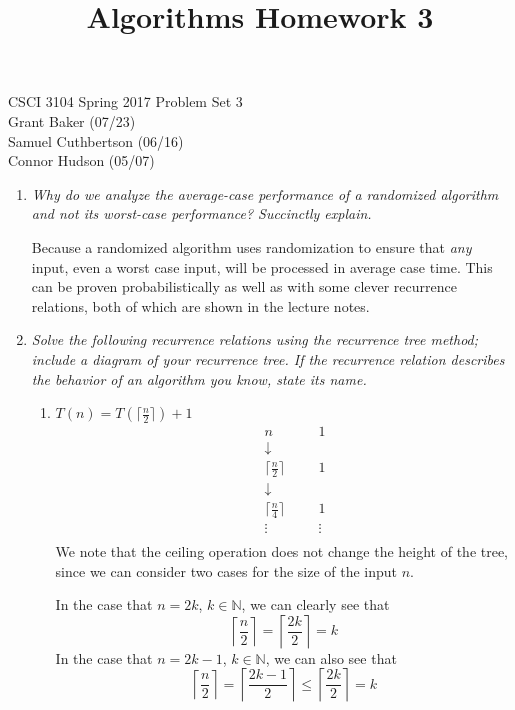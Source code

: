 \documentclass[12pt]{article}
\begin{document}
\title{Algorithms Homework 3}

CSCI 3104 Spring 2017 \hfill Problem Set 3\\
Grant Baker (07/23)\\
Samuel Cuthbertson (06/16)\\
Connor Hudson (05/07)\\


\hrulefill

\begin{enumerate}

	\item \textit{Why do we analyze the average-case performance of a randomized algorithm and not its worst-case performance? Succinctly explain.}
	
	Because a randomized algorithm uses randomization to ensure that \textit{any} input, even a worst case input, will be processed in average case time. This can be proven probabilistically as well as with some clever 
recurrence relations, both of which are shown in the lecture notes.
	
	\newpage
	\item \textit{Solve the following recurrence relations using the recurrence tree method; include a diagram of your recurrence tree. If the recurrence relation describes the behavior of an algorithm you know, state its 
name.}
    
    \begin{enumerate}
    \item $T(n) = T\left(\lceil \frac{n}{2} \rceil\right) + 1$
    \[
    \begin{array}{ccccc|c}
    &&n&&&1\\ 
    &&\downarrow&&&\\
    &&\lceil\frac{n}{2}\rceil&&&1\\
    &&\downarrow&&&\\
    &&\lceil\frac{n}{4}\rceil&&&1\\
    &&\vdots&&&\vdots\\
    \end{array}
    \]
    We note that the ceiling operation does not change the height of the tree, since we can consider two cases for the size of the input $n$.
    
    In the case that $n=2k$, $k\in\mathbb{N}$, we can clearly see that 
    \[
    \left\lceil \frac{n}{2} \right\rceil = \left\lceil \frac{2k}{2} \right\rceil = k
    \]
    In the case that $n=2k-1$, $k\in\mathbb{N}$, we can also see that
    \[
    \left\lceil \frac{n}{2} \right\rceil = \left\lceil \frac{2k-1}{2} \right\rceil \leq \left\lceil \frac{2k}{2} \right\rceil = k
    \]
    

\end{enumerate}
\end{enumerate}
\end{document}
